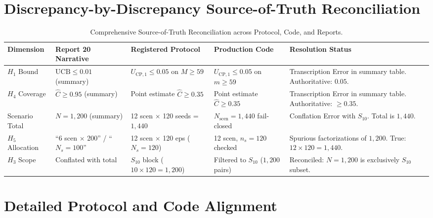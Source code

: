 \documentclass[10pt,a4paper]{article}
\begin{document}
\section{Discrepancy-by-Discrepancy Source-of-Truth Reconciliation}

\begin{table}[h!]
\centering
\small
\begin{tabularx}{\textwidth}{l p{3.2cm} p{3.4cm} p{3.4cm} X}
\toprule
\textbf{Dimension} & \textbf{Report 20 Narrative} & \textbf{Registered Protocol} & \textbf{Production Code} & \textbf{Resolution Status} \\
\midrule
$H_1$ Bound & $\text{UCB} \le 0.01$ (summary) & $U_{\mathrm{CP},1} \le 0.05$ on $M \ge 59$ & $U_{\mathrm{CP},1} \le 0.05$ on $m \ge 59$ & Transcription Error in summary table. Authoritative: $0.05$. \\
\addlinespace
$H_4$ Coverage & $\hat{C} \ge 0.95$ (summary) & Point estimate $\hat{C} \ge 0.35$ & Point estimate $\hat{C} \ge 0.35$ & Transcription Error in summary table. Authoritative: $\ge 0.35$. \\
\addlinespace
Scenario Total & $N = 1,200$ (summary) & 12 scen $\times$ 120 seeds = $1,440$ & $N_{\text{scen}} = 1,440$ fail-closed & Conflation Error with $S_{10}$. Total is $1,440$. \\
\addlinespace
$H_5$ Allocation & ``6 scen $\times$ 200'' / ``$N_s = 100$'' & 12 scen $\times$ 120 eps ($N_s = 120$) & 12 scen, $n_s = 120$ checked & Spurious factorizations of $1,200$. True: $12 \times 120 = 1,440$. \\
\addlinespace
$H_3$ Scope & Conflated with total & $S_{10}$ block ($10 \times 120 = 1,200$) & Filtered to $S_{10}$ ($1,200$ pairs) & Reconciled: $N=1,200$ is exclusively $S_{10}$ subset. \\
\bottomrule
\end{tabularx}
\caption{Comprehensive Source-of-Truth Reconciliation across Protocol, Code, and Reports.}
\end{table}

\section{Detailed Protocol and Code Alignment}
\end{document}
